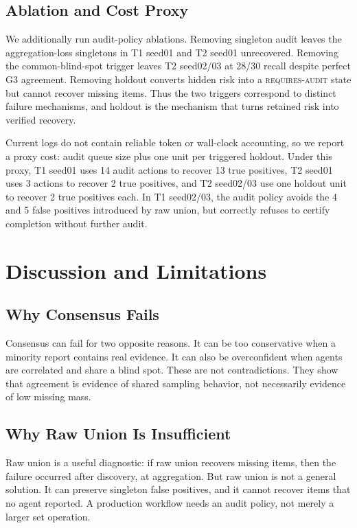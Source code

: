 \documentclass[letterpaper]{article}
\begin{document}
\subsection{Ablation and Cost Proxy}

We additionally run audit-policy ablations. Removing singleton audit leaves the
aggregation-loss singletons in T1 seed01 and T2 seed01 unrecovered. Removing the
common-blind-spot trigger leaves T2 seed02/03 at 28/30 recall despite perfect G3
agreement. Removing holdout converts hidden risk into a \textsc{requires-audit}
state but cannot recover missing items. Thus the two triggers correspond to
distinct failure mechanisms, and holdout is the mechanism that turns retained
risk into verified recovery.

Current logs do not contain reliable token or wall-clock accounting, so we
report a proxy cost: audit queue size plus one unit per triggered holdout. Under
this proxy, T1 seed01 uses 14 audit actions to recover 13 true positives, T2
seed01 uses 3 actions to recover 2 true positives, and T2 seed02/03 use one
holdout unit to recover 2 true positives each. In T1 seed02/03, the audit policy
avoids the 4 and 5 false positives introduced by raw union, but correctly
refuses to certify completion without further audit.

\section{Discussion and Limitations}

\subsection{Why Consensus Fails}

Consensus can fail for two opposite reasons. It can be too conservative when a
minority report contains real evidence. It can also be overconfident when agents
are correlated and share a blind spot. These are not contradictions. They show
that agreement is evidence of shared sampling behavior, not necessarily evidence
of low missing mass.

\subsection{Why Raw Union Is Insufficient}

Raw union is a useful diagnostic: if raw union recovers missing items, then the
failure occurred after discovery, at aggregation. But raw union is not a general
solution. It can preserve singleton false positives, and it cannot recover items
that no agent reported. A production workflow needs an audit policy, not merely
a larger set operation.
\end{document}
